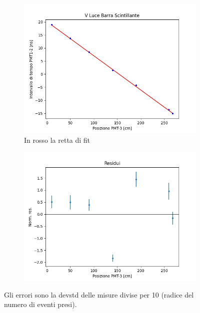 \documentclass[a4paper,twocolumn]{article}
\begin{document}
\begin{figure}[H]
     \centering
     \begin{subfigure}[b]{0.47\textwidth}
         \centering
         \includegraphics[width=\textwidth]{./immagini/TimeOfFlight/VLightBarra.jpg}
         \caption{In rosso la retta di fit}
         \label{fig:FitVLightBarra}
     \end{subfigure}
     \hfill
     \begin{subfigure}[b]{0.47\textwidth}
         \centering
         \includegraphics[width=\textwidth]{./immagini/TimeOfFlight/ResVLightBarra.jpg}
         \caption{}
         \label{fig:ResVLIghtBarra}
     \end{subfigure}
     \caption{Gli errori sono la devstd delle misure divise per 10 (radice del numero di eventi presi).} 
     \label{fig:FitLinVLightBarra}
\end{figure}
\end{document}
